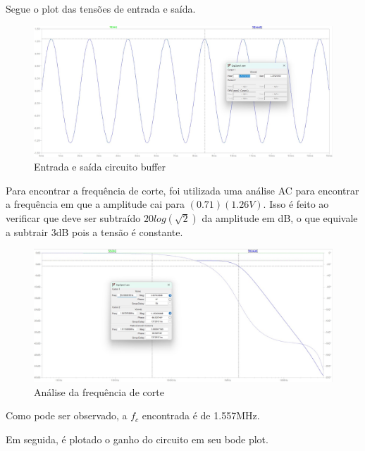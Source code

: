 \documentclass[10pt,twocolumn,letterpaper]{article}
\begin{document}
Segue o plot das tensões de entrada e saída.

\begin{figure}[h]
\caption{Entrada e saída circuito buffer}
\begin{center}
\includegraphics[scale=0.15]{figuras/fig2}
\end{center}
\end{figure}

Para encontrar a frequência de corte, foi utilizada uma análise AC para encontrar a frequência em que a amplitude cai para $(0.71)(1.26V)$.	Isso é feito ao verificar que deve ser subtraído  $20log(\sqrt{2})$ da amplitude em dB, o que equivale a subtrair 3dB pois a tensão é constante.


\begin{figure}[h]
\caption{Análise da frequência de corte}
\begin{center}
\includegraphics[scale=0.15]{figuras/fig3}
\end{center}
\end{figure}

Como pode ser observado, a $f_c$ encontrada é de 1.557MHz.

Em seguida, é plotado o ganho do circuito em seu bode plot.
\end{document}
